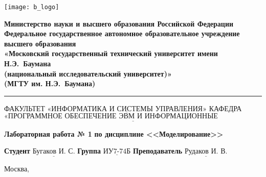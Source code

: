 \thispagestyle{empty}

\noindent \begin{minipage}{0.15\textwidth}
\texttt{[image: b\_logo]}
\end{minipage}
\noindent\begin{minipage}{0.85\textwidth}\centering
	\textbf{Министерство науки и высшего образования Российской Федерации}\\
	\textbf{Федеральное государственное автономное образовательное учреждение высшего образования}\\
	\textbf{«Московский государственный технический университет имени Н.Э.~Баумана}\\
	\textbf{(национальный исследовательский университет)»}\\
	\textbf{(МГТУ им. Н.Э.~Баумана)}
\end{minipage}

\noindent\rule{\linewidth}{3pt}
\newline\newline
\noindent ФАКУЛЬТЕТ $\underline{\text{«ИНФОРМАТИКА И СИСТЕМЫ УПРАВЛЕНИЯ»}}$ \newline\newline
\noindent КАФЕДРА $\underline{\text{«ПРОГРАММНОЕ ОБЕСПЕЧЕНИЕ ЭВМ И ИНФОРМАЦИОННЫЕ ТЕХНОЛОГИИ»}}$

\vspace{1cm}

\begin{center}
	\noindent\begin{minipage}{1.3\textwidth}\centering
		\Large\textbf{  Лабораторная работа № 1}\newline
		\textbf{по дисциплине <<Моделирование>>}\newline\newline
	\end{minipage}
\end{center}

\noindent\textbf{Студент} $\underline{\text{Бугаков И. С.}}$\newline\newline
\noindent\textbf{Группа} $\underline{\text{ИУ7-74Б}}$\newline\newline
\noindent\textbf{Преподаватель} $\underline{\text{Рудаков И. В.}}$\newline

\begin{center}
	\vfill
	Москва,~\the\year
\end{center}
\clearpage